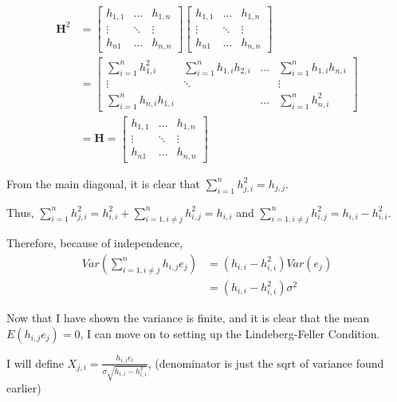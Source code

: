 \documentclass[
  letterpaper,
  DIV=11,
  numbers=noendperiod]{scrreprt}
\begin{document}
\[
\begin{aligned}
\mathbf H^2  &= \begin{bmatrix} h_{1,1} & \dots & h_{1,n} \\
\vdots &\ddots &\vdots \\
h_{n1} & \dots &h_{n,n}
\end{bmatrix} \begin{bmatrix} h_{1,1} & \dots & h_{1,n} \\
\vdots &\ddots &\vdots \\
h_{n1} & \dots &h_{n,n}
\end{bmatrix}\\
&=\begin{bmatrix} \sum_{i=1}^n h_{1,i}^2 & \sum_{i=1}^n h_{1,i}h_{2,i}  &\dots & \sum_{i=1}^n h_{1,i}h_{n,i} \\
\vdots &\ddots &&\vdots \\
\sum_{i=1}^n h_{n,i}h_{1,i}  && \dots &\sum_{i=1}^n h_{n,i}^2 
\end{bmatrix} \\
&= \mathbf H =  \begin{bmatrix} h_{1,1} & \dots & h_{1,n} \\
\vdots &\ddots &\vdots \\
h_{n1} & \dots &h_{n,n}
\end{bmatrix}
\end{aligned}
\]

From the main diagonal, it is clear that
\(\sum_{i=1}^n{h_{j,i}^2}=h_{j,j}\).

Thus,
\(\sum_{i=1}^n{h_{j,i}^2} = h_{i,i}^2+\sum_{i=1,i\neq j}^n{h_{i,j}^2}=h_{i,i}\)
and \(\sum_{i=1,i\neq j}^n{h_{i,j}^2} = h_{i,i} -h_{i,i}^2\).

Therefore, because of independence, \[ \begin{aligned}
Var \left( \sum_{i=1,i\neq j}^n h_{i,j} e_j  \right) &= (h_{i,i} -h_{i,i}^2)Var(e_j) \\ 
&=(h_{i,i} -h_{i,i}^2)\sigma^2
\end{aligned}
\]

Now that I have shown the variance is finite, and it is clear that the
mean \(E(h_{i,j} e_j) =0\), I can move on to setting up the
Lindeberg-Feller Condition.

I will define
\(X_{j,i} = \frac{h_{i,j}e_i}{\sigma\sqrt{h_{i,i}-h_{i,i}^2}}\),
(denominator is just the sqrt of variance found earlier)
\end{document}
